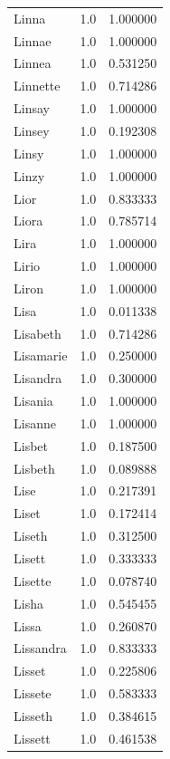 \documentclass[
  letterpaper,
  DIV=11,
  numbers=noendperiod]{scrreprt}
\begin{document}
\begin{tabular}{lrr}
Linna           &   1.0 &   1.000000 \\
Linnae          &   1.0 &   1.000000 \\
Linnea          &   1.0 &   0.531250 \\
Linnette        &   1.0 &   0.714286 \\
Linsay          &   1.0 &   1.000000 \\
Linsey          &   1.0 &   0.192308 \\
Linsy           &   1.0 &   1.000000 \\
Linzy           &   1.0 &   1.000000 \\
Lior            &   1.0 &   0.833333 \\
Liora           &   1.0 &   0.785714 \\
Lira            &   1.0 &   1.000000 \\
Lirio           &   1.0 &   1.000000 \\
Liron           &   1.0 &   1.000000 \\
Lisa            &   1.0 &   0.011338 \\
Lisabeth        &   1.0 &   0.714286 \\
Lisamarie       &   1.0 &   0.250000 \\
Lisandra        &   1.0 &   0.300000 \\
Lisania         &   1.0 &   1.000000 \\
Lisanne         &   1.0 &   1.000000 \\
Lisbet          &   1.0 &   0.187500 \\
Lisbeth         &   1.0 &   0.089888 \\
Lise            &   1.0 &   0.217391 \\
Liset           &   1.0 &   0.172414 \\
Liseth          &   1.0 &   0.312500 \\
Lisett          &   1.0 &   0.333333 \\
Lisette         &   1.0 &   0.078740 \\
Lisha           &   1.0 &   0.545455 \\
Lissa           &   1.0 &   0.260870 \\
Lissandra       &   1.0 &   0.833333 \\
Lisset          &   1.0 &   0.225806 \\
Lissete         &   1.0 &   0.583333 \\
Lisseth         &   1.0 &   0.384615 \\
Lissett         &   1.0 &   0.461538 \\

\end{tabular}
\end{document}

